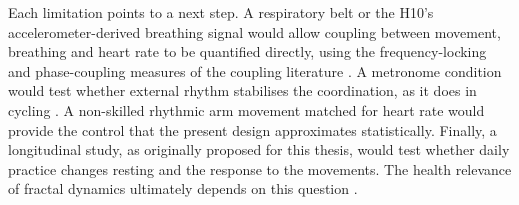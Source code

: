 Each limitation points to a next step. A respiratory belt or the H10's accelerometer-derived breathing signal would allow coupling between movement, breathing and heart rate to be quantified directly, using the frequency-locking and phase-coupling measures of the coupling literature \citep{hoffmann2015}. A metronome condition would test whether external rhythm stabilises the coordination, as it does in cycling \citep{hoffmann2012}. A non-skilled rhythmic arm movement matched for heart rate would provide the control that the present design approximates statistically. Finally, a longitudinal study, as originally proposed for this thesis, would test whether daily practice changes resting \al{} and the response to the movements. The health relevance of fractal dynamics ultimately depends on this question \citep{goldberger2002,lipsitz1992}. 
